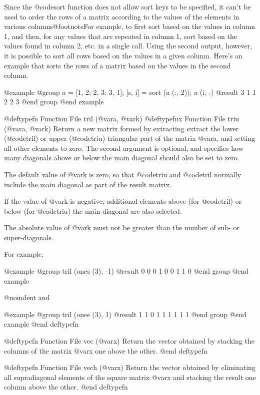 Since the @code{sort} function does not allow sort keys to be specified,
it can't be used to order the rows of a matrix according to the values
of the elements in various columns@footnote{For example, to first sort
based on the values in column 1, and then, for any values that are
repeated in column 1, sort based on the values found in column 2, etc.}
in a single call.  Using the second output, however, it is possible to
sort all rows based on the values in a given column.  Here's an example
that sorts the rows of a matrix based on the values in the second
column.

@example
@group
a = [1, 2; 2, 3; 3, 1];
[s, i] = sort (a (:, 2));
a (i, :)
     @result{}  3  1
         1  2
         2  3
@end group
@end example

@deftypefn {Function File} {} tril (@var{a}, @var{k})
@deftypefnx {Function File} {} triu (@var{a}, @var{k})
Return a new matrix formed by extracting extract the lower (@code{tril})
or upper (@code{triu}) triangular part of the matrix @var{a}, and
setting all other elements to zero.  The second argument is optional,
and specifies how many diagonals above or below the main diagonal should
also be set to zero.

The default value of @var{k} is zero, so that @code{triu} and
@code{tril} normally include the main diagonal as part of the result
matrix.

If the value of @var{k} is negative, additional elements above (for
@code{tril}) or below (for @code{triu}) the main diagonal are also
selected.

The absolute value of @var{k} must not be greater than the number of
sub- or super-diagonals.

For example,

@example
@group
tril (ones (3), -1)
     @result{}  0  0  0
         1  0  0
         1  1  0
@end group
@end example

@noindent
and

@example
@group
tril (ones (3), 1)
     @result{}  1  1  0
         1  1  1
         1  1  1
@end group
@end example
@end deftypefn

@deftypefn {Function File} {} vec (@var{x})
Return the vector obtained by stacking the columns of the matrix @var{x}
one above the other.
@end deftypefn

@deftypefn {Function File} {} vech (@var{x})
Return the vector obtained by eliminating all supradiagonal elements of
the square matrix @var{x} and stacking the result one column above the
other.
@end deftypefn

